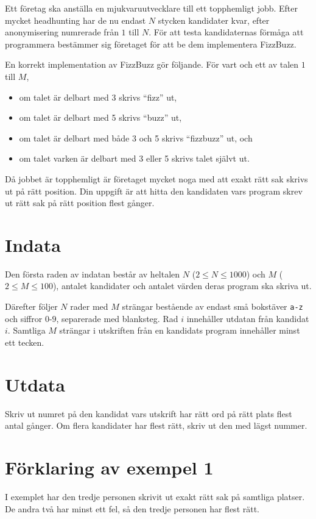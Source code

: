Ett företag ska anställa en mjukvaruutvecklare till ett topphemligt jobb.
Efter mycket headhunting har de nu endast $N$ stycken kandidater kvar, efter anonymisering numrerade från $1$ till $N$.
För att testa kandidaternas förmåga att programmera bestämmer sig företaget för att be dem implementera FizzBuzz.

En korrekt implementation av FizzBuzz gör följande.
För vart och ett av talen $1$ till $M$,
\begin{itemize}
 \item om talet är delbart med 3 skrivs ``fizz'' ut,
 \item om talet är delbart med 5 skrivs ``buzz'' ut,
 \item om talet är delbart med både 3 och 5 skrivs ``fizzbuzz'' ut, och
 \item om talet varken är delbart med 3 eller 5 skrivs talet självt ut. 
\end{itemize}

Då jobbet är topphemligt är företaget mycket noga med att exakt rätt sak skrivs ut på rätt position.
Din uppgift är att hitta den kandidaten vars program skrev ut rätt sak på rätt position flest gånger.

\section*{Indata}
Den första raden av indatan består av heltalen $N$ ($2 \leq N \leq 1000$) och $M$ ($2 \leq M \leq 100$), antalet kandidater och antalet värden deras program ska skriva ut.

Därefter följer $N$ rader med $M$ strängar bestående av endast små bokstäver \texttt{a-z} och siffror $0$-$9$, separerade med blanksteg.
Rad $i$ innehåller utdatan från kandidat $i$.
Samtliga $M$ strängar i utskriften från en kandidats program innehåller minst ett tecken.

\section*{Utdata}
Skriv ut numret på den kandidat vars utskrift har rätt ord på rätt plats flest antal gånger.
Om flera kandidater har flest rätt, skriv ut den med lägst nummer.

\section*{Förklaring av exempel 1}
I exemplet har den tredje personen skrivit ut exakt rätt sak på samtliga platser.
De andra två har minst ett fel, så den tredje personen har flest rätt.
